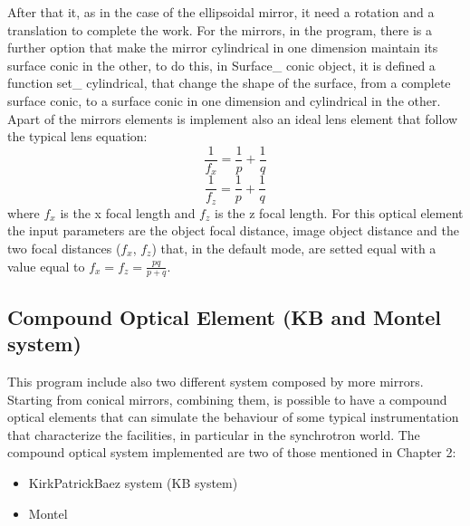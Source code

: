 %
After that it, as in the case of the ellipsoidal mirror, it need a rotation and a translation to complete the work.
For the mirrors, in the program, there is a further option that make the mirror cylindrical in one dimension maintain its surface conic in the other, to do this, in Surface\_ conic object, it is defined a function set\_ cylindrical, that change the shape of the surface, from a complete surface conic, to a surface conic in one dimension and cylindrical in the other.
\\
Apart of the mirrors elements is implement also an ideal lens element that follow the typical lens equation:
\begin{equation}
		\frac{1}{f_x} = \frac{1}{p} + \frac{1}{q}
		\label{eq: lens equation1}
\end{equation}
\begin{equation}
		\frac{1}{f_z} = \frac{1}{p} + \frac{1}{q}
		\label{eq: lens equation2}
\end{equation}
where $f_x $ is the x focal length and $f_z $ is the z focal length. For this optical element the input parameters are the object focal distance, image object distance and the two focal distances ($f_x $, $f_z $) that, in the default mode, are setted equal with a value equal to $f_x = f_z = \frac{pq}{p+q} $.

\subsection{Compound Optical Element (KB and Montel system)}

This program include also two different system composed by more mirrors. Starting from conical mirrors, combining them, is possible to have a compound optical elements that can simulate the behaviour of some typical instrumentation that characterize the facilities, in particular in the synchrotron world. The compound optical system implemented are two of those mentioned in Chapter 2:
\begin{itemize}
\item KirkPatrickBaez system (KB system)
\item Montel
\end{itemize}

